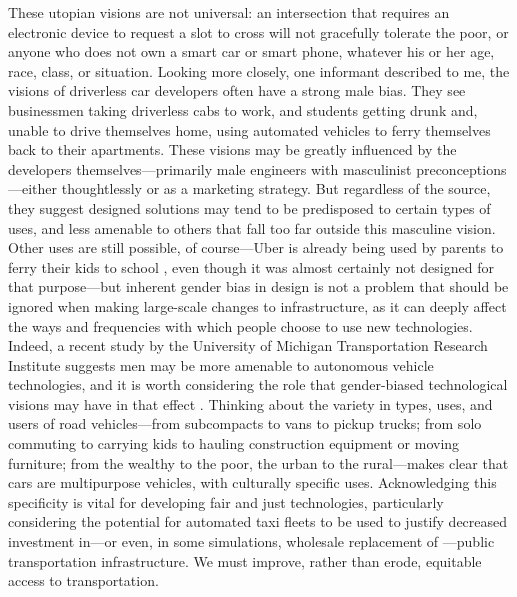 These utopian visions are not universal: an intersection that requires
an electronic device to request a slot 
to cross will not gracefully tolerate the poor, or anyone who
does not own a smart car or smart phone, whatever his or her age,
race, class, or situation.  Looking more closely, one informant described to me, the visions
of driverless car developers
often have a strong male bias. They see businessmen
taking driverless cabs to work, and students getting drunk and, unable
to drive themselves home, using automated vehicles to ferry themselves
back to their apartments. These visions may be greatly influenced by
the developers themselves---primarily male engineers with masculinist
preconceptions---either thoughtlessly or as a marketing strategy. But
regardless of the source, they suggest designed solutions may tend to
be predisposed to certain types of uses, and less amenable to others
that fall too far outside this masculine vision. Other uses are still
possible, of course---Uber is already being used by parents to ferry
their kids to school \cite{hoderParents} \cite{shapiroVan}, even
though it was almost certainly not designed 
for that
purpose---but inherent gender bias in design is not a problem that should be ignored
when making large-scale changes to infrastructure, as it can deeply
affect the ways and frequencies with which people choose to use new
technologies. Indeed, a recent study by the University of Michigan
Transportation Research Institute suggests men may be more
amenable to autonomous vehicle technologies, and it is worth
considering the role that gender-biased technological visions may have
in that
effect \cite{miglioreWomen}.
Thinking about the variety in types, uses, and users of road vehicles---from
subcompacts to vans to pickup trucks; from solo commuting to carrying kids to
hauling construction equipment or moving furniture; from the wealthy
to the poor, the urban to the rural---makes clear that cars are
multipurpose vehicles, with culturally specific uses.
Acknowledging this
specificity is vital for developing fair and just technologies,
particularly
considering the potential for automated taxi fleets to 
be used to justify decreased investment in---or even, in some
simulations, wholesale replacement of
\cite{frazzoliSingapore}---public transportation infrastructure. We must
improve, rather than erode, equitable access to transportation.


